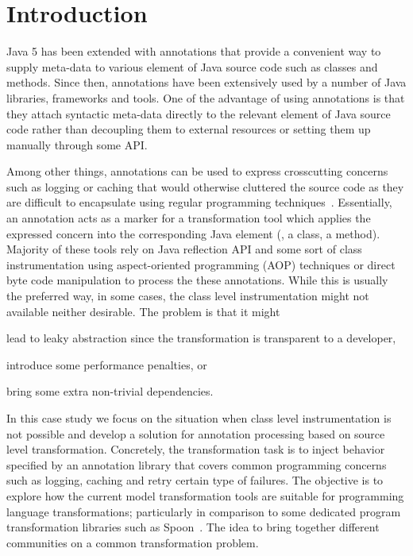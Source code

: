 
\section{Introduction}
\label{sec:Introduction}

Java 5 has been extended with annotations that provide a convenient way to supply meta-data to various element of Java source code such as classes and methods.
Since then, annotations have been extensively used by a number of Java libraries, frameworks and tools.
One of the advantage of using annotations is that they attach syntactic meta-data directly to the relevant element of Java source code rather than decoupling them to external resources or setting them up manually through some API.

Among other things, annotations can be used to express crosscutting concerns such as logging or caching that would otherwise cluttered the source code as they are difficult to encapsulate using regular programming techniques~\cite{kiczales1997}.
Essentially, an annotation acts as a marker for a transformation tool which applies the expressed concern into the corresponding Java element (\Eg, a class, a method).
Majority of these tools rely on Java reflection API and some sort of class instrumentation using aspect-oriented programming (AOP) techniques or direct byte code manipulation to process the these annotations.
While this is usually the preferred way, in some cases, the class level instrumentation might not available neither desirable.
The problem is that it might 
%
\begin{inparaenum}[(i)]
\item lead to leaky abstraction since the transformation is transparent to a developer,
\item introduce some performance penalties, or
\item bring some extra non-trivial dependencies.
\end{inparaenum}

In this case study we focus on the situation when class level instrumentation is not possible and develop a solution for annotation processing based on source level transformation.
Concretely, the transformation task is to inject behavior specified by an annotation library that covers common programming concerns such as logging, caching and retry certain type of failures.
The objective is to explore how the current model transformation tools are suitable for programming language transformations; particularly in comparison to some dedicated program transformation libraries such as Spoon~\cite{pawlak2014}.
The idea to bring together different communities on a common transformation problem.

